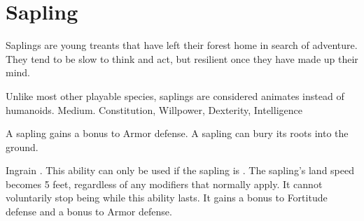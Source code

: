 \section{Sapling}

    Saplings are young treants that have left their forest home in search of adventure.
    They tend to be slow to think and act, but resilient once they have made up their mind.

     Unlike most other playable species, saplings are considered animates instead of humanoids.
     Medium.
      Constitution,  Willpower,  Dexterity,  Intelligence
    \begin{itemize}
         A sapling gains a  bonus to Armor defense.
         A sapling can bury its roots into the ground.
            \begin{activeability}{Ingrain}
                \abilityusagetime {}.
                \rankline
                This ability can only be used if the sapling is .
                The sapling's land speed becomes 5 feet, regardless of any modifiers that normally apply.
                It cannot voluntarily stop being  while this ability lasts.
                It gains a  bonus to Fortitude defense and a  bonus to Armor defense.


\end{activeability}
\end{itemize}
